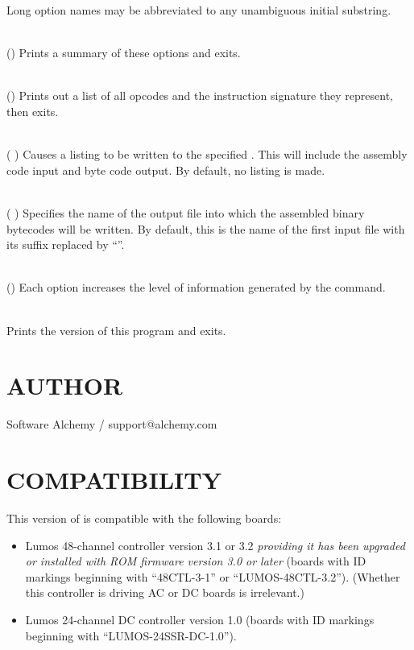 Long option names may be abbreviated to any unambiguous initial substring.
\begin{list}{}{}
\item[{\codetype{----help}}]\hfill\\
()
Prints a summary of these options and exits.
\item[{\codetype{----list--opcodes}}]\hfill\\
()
Prints out a list of all opcodes and the instruction signature they
represent, then exits.
\item[{\codetype{----listing=}\Var*{file}}]\hfill\\
(
)
Causes a listing to be written to the specified 
.
This will include the assembly code input and byte code output.
By default, no listing is made.
\item[{\codetype{----output=}\Var*{file}}]\hfill\\
(
)
Specifies the name of the output file into which the assembled
binary bytecodes will be written.  By default, this is the name of
the first input file with its suffix replaced by 
``''.
\item[{\codetype{----verbose}}]\hfill\\
()
Each 
option increases the level of information generated by the
command.
\item[{\codetype{----version}}]\hfill\\
Prints the version of this program and exits.
\end{list}
\section*{AUTHOR}


Software Alchemy / support@alchemy.com
\section*{COMPATIBILITY}


This version of 
is compatible with the following boards:
\begin{itemize}
\item
Lumos 48-channel controller version 3.1 or 3.2
\emph{providing it has been upgraded or installed with ROM firmware version 3.0 or later}
(boards with ID markings beginning with ``48CTL-3-1'' or ``LUMOS-48CTL-3.2'').  (Whether this controller is
driving AC or DC boards is irrelevant.)
\item
Lumos 24-channel DC controller version 1.0 (boards with ID markings beginning with
``LUMOS-24SSR-DC-1.0'').
\end{itemize}
